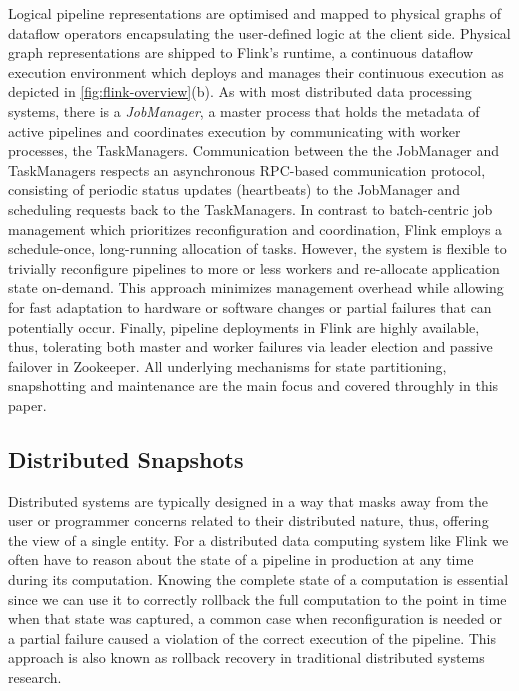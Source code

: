 Logical pipeline representations are optimised and mapped to physical graphs of dataflow operators encapsulating the user-defined logic at the client side. Physical graph representations are shipped to Flink's runtime, a continuous dataflow execution environment which deploys and manages their continuous execution as depicted in \autoref{fig:flink-overview}(b). As with most distributed data processing systems, there is a \emph{JobManager}, a master process that holds the metadata of active pipelines and coordinates execution by communicating with worker processes, the TaskManagers. Communication between the the JobManager and TaskManagers respects an asynchronous RPC-based communication protocol, consisting of periodic status updates (heartbeats) to the JobManager and scheduling requests back to the TaskManagers. In contrast to batch-centric job management \cite{zaharia2012discretized,venkataramandrizzle} which prioritizes reconfiguration and coordination, Flink employs a schedule-once, long-running allocation of tasks. However, the system is flexible to trivially reconfigure pipelines to more or less workers and re-allocate application state on-demand. This approach minimizes management overhead while allowing for fast adaptation to hardware or software changes or partial failures that can potentially occur. Finally, pipeline deployments in Flink are highly available, thus, tolerating both master and worker failures via leader election and passive failover in Zookeeper. All underlying mechanisms for state partitioning, snapshotting and maintenance are the main focus and covered throughly in this paper.


\subsection{Distributed Snapshots}

Distributed systems are typically designed in a way that masks away from the user or programmer concerns related to their distributed nature, thus, offering the view of a single entity. For a distributed data computing system like Flink we often have to reason about the state of a pipeline in production at any time during its computation. Knowing the complete state of a computation is essential since we can use it to correctly rollback the full computation to the point in time when that state was captured, a common case when reconfiguration is needed or a partial failure caused a violation of the correct execution of the pipeline. This approach is also known as rollback recovery \cite{elnozahy2002survey} in traditional distributed systems research.




